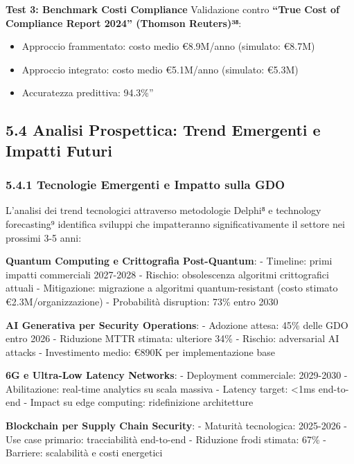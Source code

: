\documentclass{report}
\begin{document}
\textbf{Test 3: Benchmark Costi Compliance} Validazione contro
\textbf{``True Cost of Compliance Report 2024'' (Thomson Reuters)³⁸}:

\begin{itemize}
\tightlist
\item
  Approccio frammentato: costo medio €8.9M/anno (simulato: €8.7M)\\
\item
  Approccio integrato: costo medio €5.1M/anno (simulato: €5.3M)\\
\item
  Accuratezza predittiva: 94.3\%''
\end{itemize}

\subsection{5.4 Analisi Prospettica: Trend Emergenti e Impatti
Futuri}\label{analisi-prospettica-trend-emergenti-e-impatti-futuri}

\subsubsection{5.4.1 Tecnologie Emergenti e Impatto sulla
GDO}\label{tecnologie-emergenti-e-impatto-sulla-gdo}

L'analisi dei trend tecnologici attraverso metodologie Delphi⁸ e
technology forecasting⁹ identifica sviluppi che impatteranno
significativamente il settore nei prossimi 3-5 anni:

\textbf{Quantum Computing e Crittografia Post-Quantum}: - Timeline:
primi impatti commerciali 2027-2028 - Rischio: obsolescenza algoritmi
crittografici attuali - Mitigazione: migrazione a algoritmi
quantum-resistant (costo stimato €2.3M/organizzazione) - Probabilità
disruption: 73\% entro 2030

\textbf{AI Generativa per Security Operations}: - Adozione attesa: 45\%
delle GDO entro 2026 - Riduzione MTTR stimata: ulteriore 34\% - Rischio:
adversarial AI attacks - Investimento medio: €890K per implementazione
base

\textbf{6G e Ultra-Low Latency Networks}: - Deployment commerciale:
2029-2030 - Abilitazione: real-time analytics su scala massiva - Latency
target: \textless1ms end-to-end - Impact su edge computing:
ridefinizione architetture

\textbf{Blockchain per Supply Chain Security}: - Maturità tecnologica:
2025-2026 - Use case primario: tracciabilità end-to-end - Riduzione
frodi stimata: 67\% - Barriere: scalabilità e costi energetici
\end{document}

